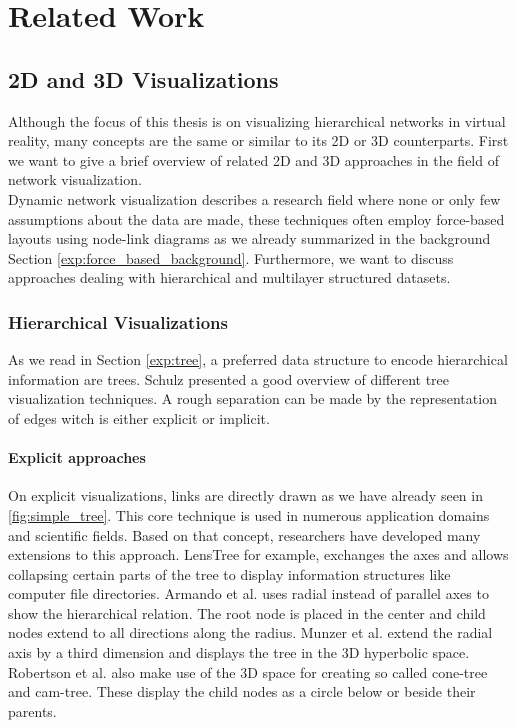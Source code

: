 \chapter{Related Work}

\section{2D and 3D Visualizations}
\label{chap:rw-2d3dLayout}
Although the focus of this thesis is on visualizing hierarchical networks in virtual reality, many concepts are the same or similar to its 2D or 3D counterparts. First we want to give a brief overview of related 2D and 3D approaches in the field of network visualization.\\
Dynamic network visualization describes a research field where none or only few assumptions about the data are made, these techniques often employ force-based layouts using node-link diagrams as we already summarized in the background Section \ref{exp:force_based_background}. Furthermore, we want to discuss approaches dealing with hierarchical and multilayer structured datasets.

\subsection{Hierarchical Visualizations}

As we read in Section \ref{exp:tree}, a preferred data structure to encode hierarchical information are trees.
Schulz \cite{schulz_treevisnet_2011} presented a good overview of different tree visualization techniques. A rough separation can be made by the representation of edges witch is either explicit or implicit. 

\subsubsection{Explicit approaches}
On explicit visualizations, links are directly drawn as we have already seen in \ref{fig:simple_tree}. This core technique is used in numerous application domains and scientific fields. Based on that concept, researchers have developed many extensions to this approach.
LensTree \cite{song_lenstree_2006} for example, exchanges the axes and allows collapsing certain parts of the tree to display information structures like computer file directories. 
Armando et al. \cite{arce-orozco_radial_2017} uses radial instead of parallel axes to show the hierarchical relation. The root node is placed in the center and child nodes extend to all directions along the radius.
Munzer et al. \cite{munzner_h3_1997} extend the radial axis by a third dimension and displays the tree in the 3D hyperbolic space.
Robertson et al. \cite{robertson_cone_1991} also make use of the 3D space for creating so called cone-tree and cam-tree. These display the child nodes as a circle below or beside their parents.  

